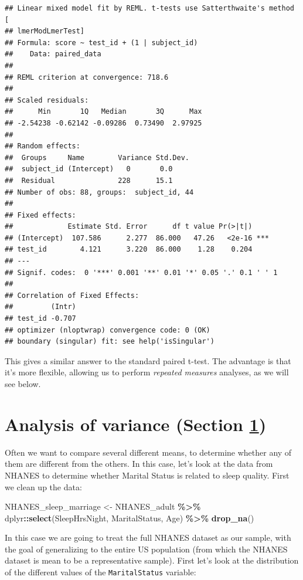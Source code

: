 \documentclass[
  12pt,
]{book}
\newenvironment{Shaded}{\begin{snugshade}}{\end{snugshade}}
\newcommand{\FunctionTok}[1]{\textcolor[rgb]{0.13,0.29,0.53}{\textbf{#1}}}
\newcommand{\NormalTok}[1]{#1}
\newcommand{\OtherTok}[1]{\textcolor[rgb]{0.56,0.35,0.01}{#1}}
\newcommand{\SpecialCharTok}[1]{\textcolor[rgb]{0.81,0.36,0.00}{\textbf{#1}}}
\begin{document}
\begin{verbatim}
## Linear mixed model fit by REML. t-tests use Satterthwaite's method [
## lmerModLmerTest]
## Formula: score ~ test_id + (1 | subject_id)
##    Data: paired_data
## 
## REML criterion at convergence: 718.6
## 
## Scaled residuals: 
##      Min       1Q   Median       3Q      Max 
## -2.54238 -0.62142 -0.09286  0.73490  2.97925 
## 
## Random effects:
##  Groups     Name        Variance Std.Dev.
##  subject_id (Intercept)   0       0.0    
##  Residual               228      15.1    
## Number of obs: 88, groups:  subject_id, 44
## 
## Fixed effects:
##             Estimate Std. Error      df t value Pr(>|t|)    
## (Intercept)  107.586      2.277  86.000   47.26   <2e-16 ***
## test_id        4.121      3.220  86.000    1.28    0.204    
## ---
## Signif. codes:  0 '***' 0.001 '**' 0.01 '*' 0.05 '.' 0.1 ' ' 1
## 
## Correlation of Fixed Effects:
##         (Intr)
## test_id -0.707
## optimizer (nloptwrap) convergence code: 0 (OK)
## boundary (singular) fit: see help('isSingular')
\end{verbatim}

This gives a similar answer to the standard paired t-test. The advantage is that it's more flexible, allowing us to perform \emph{repeated measures} analyses, as we will see below.

\hypertarget{ANOVA}{%
\section{Analysis of variance (Section \ref{ANOVA})}\label{ANOVA}}

Often we want to compare several different means, to determine whether any of them are different from the others. In this case, let's look at the data from NHANES to determine whether Marital Status is related to sleep quality. First we clean up the data:

\begin{Shaded}
\begin{Highlighting}[]
\NormalTok{NHANES\_sleep\_marriage }\OtherTok{\textless{}{-}} 
\NormalTok{  NHANES\_adult }\SpecialCharTok{\%\textgreater{}\%}
\NormalTok{  dplyr}\SpecialCharTok{::}\FunctionTok{select}\NormalTok{(SleepHrsNight, MaritalStatus, Age) }\SpecialCharTok{\%\textgreater{}\%}
  \FunctionTok{drop\_na}\NormalTok{()}
\end{Highlighting}
\end{Shaded}

In this case we are going to treat the full NHANES dataset as our sample, with the goal of generalizing to the entire US population (from which the NHANES dataset is mean to be a representative sample). First let's look at the distribution of the different values of the \texttt{MaritalStatus} variable:
\end{document}
